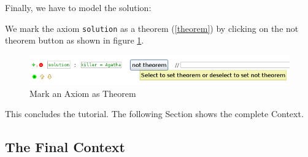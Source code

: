 Finally, we have to model the solution:


We mark the axiom \texttt{solution} as a theorem (\ref{theorem}) by clicking on the \textsf{not theorem} button as shown in figure \ref{fig_tut_05_mark_theorem}.

\begin{figure}[!h]
\begin{center}
	\includegraphics{img/tutorial/tut_05_agatha3.png}
	\caption{Mark an Axiom as Theorem}
	\label{fig_tut_05_mark_theorem}
\end{center}
\end{figure}


This concludes the tutorial. The following Section shows the complete Context.

\subsection{The Final Context} \label{tut_05_final_context}

